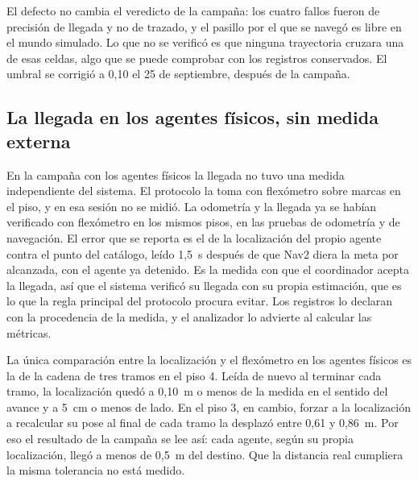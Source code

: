El defecto no cambia el veredicto de la campaña: los cuatro fallos fueron de precisión de llegada y no de trazado, y el pasillo por el que se navegó es libre en el mundo simulado. Lo que no se verificó es que ninguna trayectoria cruzara una de esas celdas, algo que se puede comprobar con los registros conservados. El umbral se corrigió a 0,10 el 25 de septiembre, después de la campaña.

\subsection{La llegada en los agentes físicos, sin medida externa}
\label{sec:lim-llegada}

En la campaña con los agentes físicos la llegada no tuvo una medida independiente del
sistema. El protocolo la toma con flexómetro sobre marcas en el piso, y en esa sesión no se midió. La odometría y la llegada ya se habían verificado con flexómetro en los mismos pisos, en las pruebas de odometría y de navegación. El error que se reporta es el de la localización del propio
agente contra el punto del catálogo, leído 1,5~s después de que Nav2 diera la
meta por alcanzada, con el agente ya detenido. Es la medida con que el coordinador acepta la llegada, así que el sistema verificó su llegada con su
propia estimación, que es lo que la regla principal del protocolo procura evitar. Los registros lo declaran con la procedencia de la
medida, y el analizador lo advierte al calcular las métricas.

La única comparación entre la localización y el flexómetro en los agentes físicos es la de la cadena de tres tramos en el piso 4. Leída de
nuevo al terminar cada tramo, la localización quedó a 0,10~m o menos de la medida
en el sentido del avance y a 5~cm o menos de lado. En el piso 3, en cambio, forzar
a la localización a recalcular su pose al final de cada tramo la desplazó entre
0,61 y 0,86~m. Por eso el resultado de la campaña se lee así: cada agente,
según su propia localización, llegó a menos de 0,5~m del destino. Que la
distancia real cumpliera la misma tolerancia no está medido.
